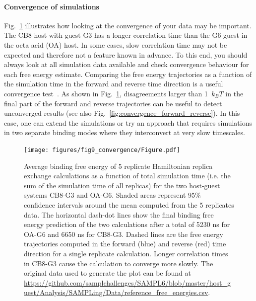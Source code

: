 \documentclass[9pt,bestpractices]{livecoms}
\begin{document}
\paragraph{Convergence of simulations}
Fig.~\ref{fig:freeenergytrajectories} illustrates how looking at the convergence of your data may be important. The CB8 host with guest G3 has a longer correlation time than the G6 guest in the octa acid (OA) host. In some cases, slow correlation time may not be expected and therefore not a feature known in advance. To this end, you should always look at all simulation data available and check convergence behaviour for each free energy estimate.
Comparing the free energy trajectories as a function of the simulation time in the forward and reverse time direction is a useful convergence test~\cite{klimovich2015guidelines}.
As shown in Fig.~\ref{fig:freeenergytrajectories}, disagreements larger than 1~$k_{B}T$ in the final part of the forward and reverse trajectories can be useful to detect unconverged results (see also Fig.~\ref{fig:convergence_forward_reverse}).
In this case, one can extend the simulations or try an approach that requires simulations in two separate binding modes where they interconvert at very slow timescales.  
\begin{figure}
    \texttt{[image: figures/fig9\_convergence/Figure.pdf]}
    \caption{Average binding free energy of 5 replicate Hamiltonian replica exchange calculations as a function of total simulation time (i.e. the sum of the simulation time of all replicas) for the two host-guest systems CB8-G3 and OA-G6. Shaded areas represent 95\% confidence intervals around the mean computed from the 5 replicates data. The horizontal dash-dot lines show the final binding free energy prediction of the two calculations after a total of 5230 ns for OA-G6 and 6650 ns for CB8-G3. Dashed lines are the free energy trajectories computed in the forward (blue) and reverse (red) time direction for a single replicate calculation. Longer correlation times in CB8-G3 cause the calculation to converge more slowly. The original data used to generate the plot can be found at \url{https://github.com/samplchallenges/SAMPL6/blob/master/host_guest/Analysis/SAMPLing/Data/reference_free_energies.csv}.
}
    \label{fig:freeenergytrajectories}
\end{figure}
\end{document}
